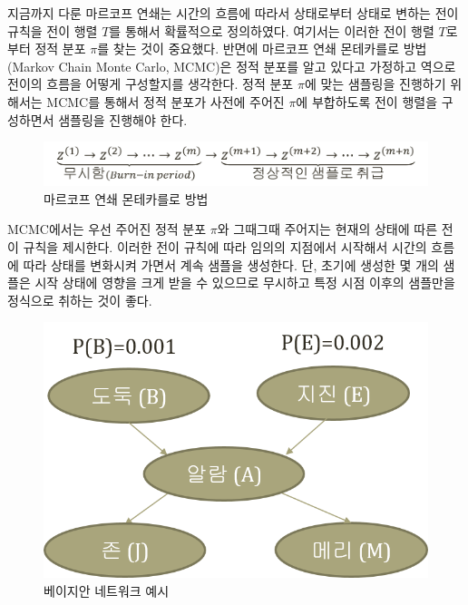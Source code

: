 \documentclass[a4paper]{oblivoir}
\begin{document}
지금까지 다룬 마르코프 연쇄는 시간의 흐름에 따라서 상태로부터 상태로 변하는 전이 규칙을 전이 행렬 $T$를 통해서 확률적으로 정의하였다. 여기서는 이러한 전이 행렬 $T$로부터 정적 분포 $\pi$를 찾는 것이 중요했다. 반면에 마르코프 연쇄 몬테카를로 방법(Markov Chain Monte Carlo, MCMC)은 정적 분포를 알고 있다고 가정하고 역으로 전이의 흐름을 어떻게 구성할지를 생각한다. 정적 분포 $\pi$에 맞는 샘플링을 진행하기 위해서는 MCMC를 통해서 정적 분포가 사전에 주어진 $\pi$에 부합하도록 전이 행렬을 구성하면서 샘플링을 진행해야 한다.  \\

\begin{figure}[ht] \centering 
\includegraphics[scale=0.6]{fig10_10.png} 
\caption{마르코프 연쇄 몬테카를로 방법}
\label{fig:10-10}
\end{figure}  

MCMC에서는 우선 주어진 정적 분포 $\pi$와 그때그때 주어지는 현재의 상태에 따른 전이 규칙을 제시한다. 이러한 전이 규칙에 따라 임의의 지점에서 시작해서 시간의 흐름에 따라 상태를 변화시켜 가면서 계속 샘플을 생성한다. 단, 초기에 생성한 몇 개의 샘플은 시작 상태에 영향을 크게 받을 수 있으므로 무시하고 특정 시점 이후의 샘플만을 정식으로 취하는 것이 좋다. \\

\begin{figure}[ht] \centering 
\includegraphics[scale=0.6]{fig10_1.png} 
\caption{베이지안 네트워크 예시}
\label{fig:10-12}
\end{figure}  
\end{document}
